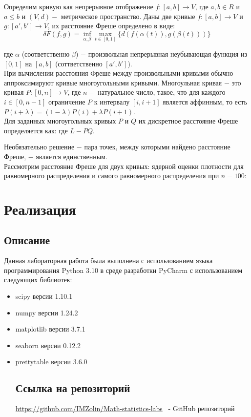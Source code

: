 \documentclass[a4paper,14pt]{article}
\begin{document}
	Определим кривую как непрерывное отображение $f: [a,b] \rightarrow V$, где $a, b \in R$ и $a \leq b$ и $(V,d) - $ метрическое пространство.
	Даны две кривые $f: [a,b] \rightarrow V$ и $g: [a',b'] \rightarrow V$, их расстояние Фреше определено в виде:
	\begin{equation}
		\delta F(f,g) = \inf_{\alpha, \beta}\max_{t \in [0,1]}{\{d(f(\alpha(t)), g(\beta(t)))\}}
	\end{equation}
	
	где $\alpha$ (соответственно $\beta$) $-$ произвольная непрерывная неубывающая функция из $[0, 1]$ на $[a, b]$ (соттветственно $[a',b']$). \\
	При вычислении расстояния Фреше между произвольными кривыми обычно аппроксимируют кривые многоугольными кривыми. Многоульная кривая $-$ это кривая $P: [0,n] \rightarrow V$, где $n - $ натуральное число, такое, что для каждого $i \in [0,n-1]$ ограничение $P$ к интервалу $[i,i+1]$ является аффинным, то есть $P(i+\lambda) = (1-\lambda)P(i)+\lambda P(i+1)$. \\
	Для заданных многоугольных кривых $P$ и $Q$ их дискретное расстояние Фреше определяется как:
	где $L - PQ$.
	
	Необязательно решение $ - $ пара точек, между которыми найдено расстояние Фреше, $-$ является единственным. \\
	
	Рассмотрим расстояние Фреше для двух кривых: ядерной оценки плотности для равномерного распределения и самого равномерного распределения при $n=100$:
		\section{Реализация}
	\subsection{Описание}
	Данная лабораторная работа была выполнена с использованием языка
	программирования Python 3.10 в среде разработки PyCharm с
	использованием следующих библиотек:
	\begin{itemize}
		\item scipy версии 1.10.1
		\item numpy версии 1.24.2
		\item matplotlib версии 3.7.1
		\item seaborn версии 0.12.2
		\item prettytable
		версии 3.6.0
		\subsection{Ссылка на репозиторий}
		\url{https://github.com/IMZolin/Math-statistics-labs} \ - GitHub репозиторий
	\end{itemize}
\end{document}
